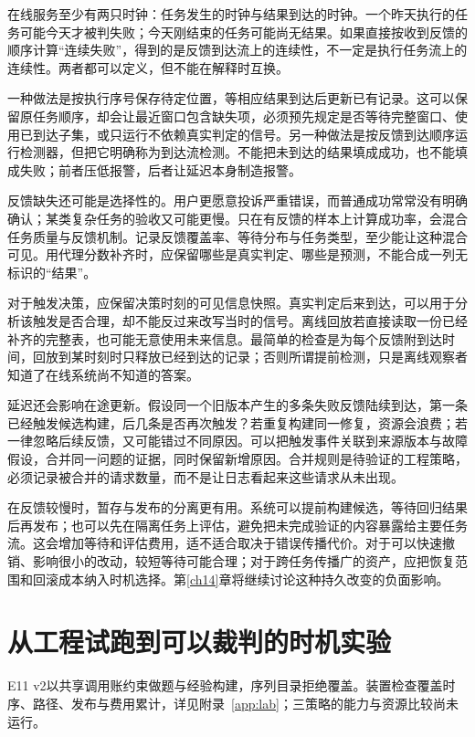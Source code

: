 在线服务至少有两只时钟：任务发生的时钟与结果到达的时钟。一个昨天执行的任务可能今天才被判失败；今天刚结束的任务可能尚无结果。如果直接按收到反馈的顺序计算“连续失败”，得到的是反馈到达流上的连续性，不一定是执行任务流上的连续性。两者都可以定义，但不能在解释时互换。

一种做法是按执行序号保存待定位置，等相应结果到达后更新已有记录。这可以保留原任务顺序，却会让最近窗口包含缺失项，必须预先规定是否等待完整窗口、使用已到达子集，或只运行不依赖真实判定的信号。另一种做法是按反馈到达顺序运行检测器，但把它明确称为到达流检测。不能把未到达的结果填成成功，也不能填成失败；前者压低报警，后者让延迟本身制造报警。

反馈缺失还可能是选择性的。用户更愿意投诉严重错误，而普通成功常常没有明确确认；某类复杂任务的验收又可能更慢。只在有反馈的样本上计算成功率，会混合任务质量与反馈机制。记录反馈覆盖率、等待分布与任务类型，至少能让这种混合可见。用代理分数补齐时，应保留哪些是真实判定、哪些是预测，不能合成一列无标识的“结果”。

对于触发决策，应保留决策时刻的可见信息快照。真实判定后来到达，可以用于分析该触发是否合理，却不能反过来改写当时的信号。离线回放若直接读取一份已经补齐的完整表，也可能无意使用未来信息。最简单的检查是为每个反馈附到达时间，回放到某时刻时只释放已经到达的记录；否则所谓提前检测，只是离线观察者知道了在线系统尚不知道的答案。

延迟还会影响在途更新。假设同一个旧版本产生的多条失败反馈陆续到达，第一条已经触发候选构建，后几条是否再次触发？若重复构建同一修复，资源会浪费；若一律忽略后续反馈，又可能错过不同原因。可以把触发事件关联到来源版本与故障假设，合并同一问题的证据，同时保留新增原因。合并规则是待验证的工程策略，必须记录被合并的请求数量，而不是让日志看起来这些请求从未出现。

在反馈较慢时，暂存与发布的分离更有用。系统可以提前构建候选，等待回归结果后再发布；也可以先在隔离任务上评估，避免把未完成验证的内容暴露给主要任务流。这会增加等待和评估费用，适不适合取决于错误传播代价。对于可以快速撤销、影响很小的改动，较短等待可能合理；对于跨任务传播广的资产，应把恢复范围和回滚成本纳入时机选择。第\ref{ch14}章将继续讨论这种持久改变的负面影响。

\section{从工程试跑到可以裁判的时机实验}
\label{sec:ch13-evidence-ladder}

E11 v2以共享调用账约束做题与经验构建，序列目录拒绝覆盖。装置检查覆盖时序、路径、发布与费用累计，详见附录~\ref{app:lab}；三策略的能力与资源比较尚未运行。

